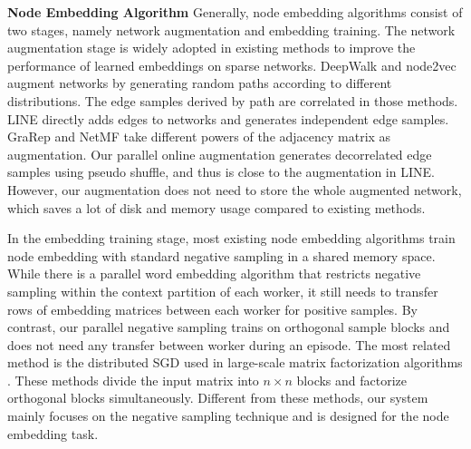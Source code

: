 \documentclass[sigconf]{acmart}
\begin{document}
\medskip \noindent \textbf{Node Embedding Algorithm}
Generally, node embedding algorithms consist of two stages, namely network augmentation and embedding training. The network augmentation stage is widely adopted in existing methods \cite{perozzi2014deepwalk, tang2015line, cao2015grarep, grover2016node2vec, qiu2018network} to improve the performance of learned embeddings on sparse networks. DeepWalk \cite{perozzi2014deepwalk} and node2vec \cite{grover2016node2vec} augment networks by generating random paths according to different distributions. The edge samples derived by path are correlated in those methods. LINE \cite{tang2015line} directly adds edges to networks and generates independent edge samples. GraRep \cite{cao2015grarep} and NetMF \cite{qiu2018network} take different powers of the adjacency matrix as augmentation. Our parallel online augmentation generates decorrelated edge samples using pseudo shuffle, and thus is close to the augmentation in LINE. However, our augmentation does not need to store the whole augmented network, which saves a lot of disk and memory usage compared to existing methods.

In the embedding training stage, most existing node embedding algorithms \cite{perozzi2014deepwalk, tang2015line, grover2016node2vec} train node embedding with standard negative sampling \cite{mikolov2013distributed} in a shared memory space. While there is a parallel word embedding algorithm \cite{stergiou2017distributed} that restricts negative sampling within the context partition of each worker, it still needs to transfer rows of embedding matrices between each worker for positive samples. By contrast, our parallel negative sampling trains on orthogonal sample blocks and does not need any transfer between worker during an episode. The most related method is the distributed SGD used in large-scale matrix factorization algorithms \cite{gemulla2011large, zhuang2013fast, yun2014nomad, bhavana2019bmf}. These methods divide the input matrix into $n \times n$ blocks and factorize orthogonal blocks simultaneously. Different from these methods, our system mainly focuses on the negative sampling technique and is designed for the node embedding task.
\end{document}
